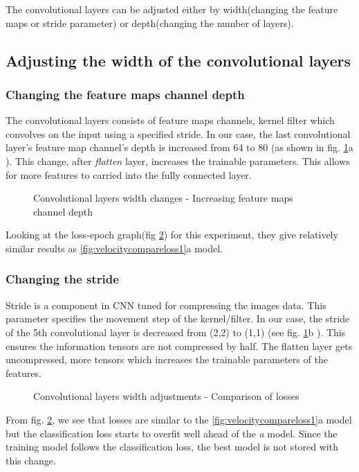 The convolutional layers can be adjusted either by width(changing the feature maps or
stride parameter) or depth(changing the number of layers).
\subsection{Adjusting the width of the convolutional layers}
\subsubsection*{Changing the feature maps channel depth}
The convolutional layers consists of feature maps channels, kernel filter which convolves
on the input using a specified stride. In our case, the last convolutional layer's feature
map channel's depth is increased from 64 to 80 (as shown in fig. \ref{fig:convlayerschange1}a ). This change, after \textit{flatten} layer,
increases the trainable parameters. This allows for more features to carried into the fully connected layer.
\begin{figure}[!ht]
    \def\svgwidth{1\textwidth}
    \caption{Convolutional layers width changes - Increasing feature maps channel depth}
    \label{fig:convlayerschange1}
\end{figure}
Looking at the loss-epoch graph(fig \ref{fig:convlayerslosses1}) for this experiment, they
give relatively similar results as \ref{fig:velocitycompareloss1}a model.
\subsubsection*{Changing the stride}
Stride is a component in CNN tuned for compressing the images data. This parameter
specifies the movement step of the kernel/filter. In our case, the stride of the 5th
convolutional layer is decreased from (2,2) to (1,1) (see fig.
\ref{fig:convlayerschange1}b ). This ensures the information
tensors are not compressed by half. The flatten layer gets uncompressed, more tensors
which increases the trainable parameters of the features.
\begin{figure}[!ht]
    \centering
    \def\svgwidth{\textwidth}
    \caption{Convolutional layers width adjustments - Comparison of losses}
    \label{fig:convlayerslosses1}
\end{figure}
From fig. \ref{fig:convlayerslosses1}, we see that losses are similar to the
\ref{fig:velocitycompareloss1}a model but the classification loss starts to overfit well
ahead of the \textit{a} model. Since the training model follows the classification loss,
the best model is not stored with this change.

